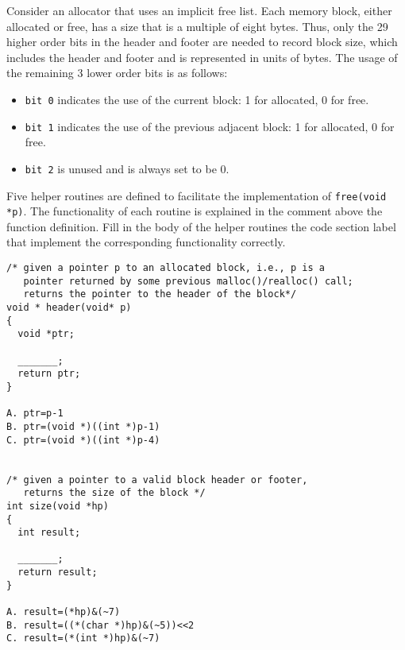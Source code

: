 \begin{problem}{10} 
\end{problem}
Consider an allocator that uses an implicit free list. Each memory
block, either allocated or free, has a size that is a multiple of
eight bytes. Thus, only the 29 higher order bits in the header and
footer are needed to record block size, which includes the header and
footer and is represented in units of bytes.  The usage of the
remaining 3 lower order bits is as follows:
\begin{itemize}
\item {\tt bit 0} indicates the use of the current block: 1 for allocated, 0 for free.
\item {\tt bit 1} indicates the use of the previous adjacent block: 1 for allocated, 0 for free.
\item {\tt bit 2} is unused and is always set to be 0.
\end{itemize}
 
Five helper routines are defined to facilitate the implementation of
{\tt free(void *p)}. The functionality of each routine is explained in
the comment above the function definition.  Fill in the body of the
helper routines the code section label that implement the
corresponding functionality correctly.


{\small\begin{verbatim}
/* given a pointer p to an allocated block, i.e., p is a
   pointer returned by some previous malloc()/realloc() call;
   returns the pointer to the header of the block*/
void * header(void* p)			
{
  void *ptr;			

  _______;	
  return ptr;
}

A. ptr=p-1  
B. ptr=(void *)((int *)p-1)  
C. ptr=(void *)((int *)p-4) 


/* given a pointer to a valid block header or footer,
   returns the size of the block */
int size(void *hp)
{
  int result;

  _______;
  return result;
}

A. result=(*hp)&(~7)  
B. result=((*(char *)hp)&(~5))<<2  
C. result=(*(int *)hp)&(~7) 

\end{verbatim}}

